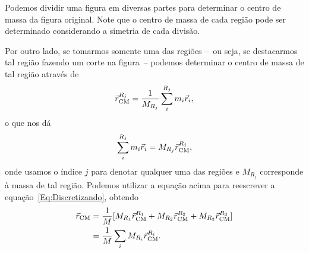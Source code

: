 \begin{marginfigure}
\centering
{}
\caption{Podemos dividir uma figura em diversas partes para determinar o centro de massa da figura original. Note que o centro de massa de cada região pode ser determinado considerando a simetria de cada divisão.\label{Fig:PlacaAssimetricaDividida}}
\end{marginfigure}

Por outro lado, se tomarmos somente uma das regiões --~ou seja, se destacarmos tal região fazendo um corte na figura~-- podemos determinar o centro de massa de tal região através de
\begin{equation}
    \vec{r}_{\rm{CM}}^{R_j} = \frac{1}{M_{R_j}} \sum_{i}^{R_j} m_i \vec{r}_i,
\end{equation}
%
o que nos dá
\begin{equation}\label{Eq:RegiaoDiscreta}
    \sum_{i}^{R_j} m_i \vec{r}_i = M_{R_j} \vec{r}_{\rm{CM}}^{R_j},
\end{equation}
%
onde usamos o índice $j$ para denotar qualquer uma das regiões e $M_{R_j}$ corresponde à massa de tal região. Podemos utilizar a equação acima para reescrever a equação~\eqref{Eq:Discretizando}, obtendo
\begin{align}
    \vec{r}_{\rm{CM}} &= \frac{1}{M} [M_{R_1} \vec{r}_{\rm{CM}}^{R_1} + M_{R_2} \vec{r}_{\rm{CM}}^{R_2} + M_{R_3} \vec{r}_{\rm{CM}}^{R_3}] \\
    &= \frac{1}{M} \sum_{i} M_{R_i} \vec{r}_{\rm{CM}}^{R_i} \label{Eq:Discretizado}.
\end{align}


